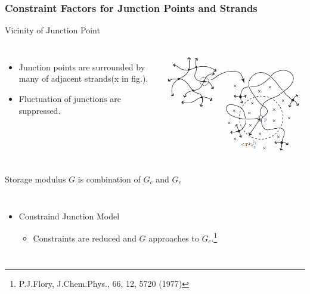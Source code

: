 \documentclass[12pt, dvipdfmx]{beamer}
\begin{document}
\begin{frame}
	\frametitle{Constraint Factors for Junction Points and Strands}
		\vspace{-2mm}
		\begin{alertblock}{Vicinity of Junction Point}
			\begin{columns}[totalwidth=1\textwidth]
				\vspace{-3mm}
				\begin{itemize}
					\item Junction points are surrounded by many of \alert{adjacent strands(x in fig.).}
					\item %
					Fluctuation of junctions are \alert{suppressed}. 
				\end{itemize}
				\centering
				\includegraphics[width=\textwidth]{JP_vicinity.png}
			\end{columns}
		\end{alertblock}
		\vspace{-1mm}
		Storage modulus $G$ is \alert{combination of $G_c$ and $G_e$}
		\vspace{-1mm}
			\begin{columns}[totalwidth=1\textwidth]
				\begin{itemize}
					\item Constraind Junction Model
					\begin{itemize}
						\item Constraints are reduced and $G$ approaches to $G_c$.\footnote{\tiny{P.J.Flory, J.Chem.Phys., 66, 12, 5720 (1977)}}
					\end{itemize}

\end{itemize}
\end{columns}
\end{frame}
\end{document}
